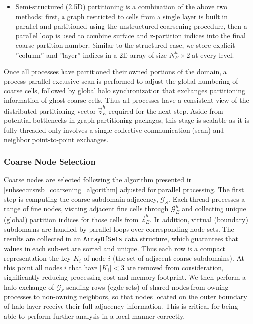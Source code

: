 \begin{itemize}
\item Semi-structured (2.5D) partitioning is a combination of the above two methods: first, a graph restricted to cells from a single layer is built in parallel and partitioned using the unstructured coarsening procedure, then a parallel loop is used to combine surface and z-partition indices into the final coarse partition number.   Similar to the structured case, we store explicit ''column'' and ''layer'' indices in a 2D array of size $N_E^h \times 2$ at every level.
\end{itemize}
Once all processes have partitioned their owned portions of the domain, a process-parallel exclusive scan is performed to adjust the global numbering of coarse cells, followed by global halo synchronization that exchanges partitioning information of ghost coarse cells.   Thus all processes have a consistent view of the distributed partitioning vector $\vec{z}_E^h$ required for the next step.   Aside from potential bottlenecks in graph partitioning packages, this stage is scalable as it is fully threaded only involves a single collective communication (scan) and neighbor point-to-point exchanges.

\subsubsection{Coarse Node Selection}
\label{subsubsec:par_kernels_coarsening_nodes}

Coarse nodes are selected following the algorithm presented in \cref{subsec:msrsb_coarsening_algorithm} adjusted for parallel processing.   The first step is computing the coarse subdomain adjacency, $\mathcal{G}_S$.   Each thread processes a range of fine nodes, visiting adjacent fine cells through $\mathcal{G}_E^h$ and collecting unique (global) partition indices for those cells from $\vec{z}_E^h$.   In addition, virtual (boundary) subdomains are handled by parallel loops over corresponding node sets.   The results are collected in an \texttt{ArrayOfSets} data structure, which guarantees that values in each sub-set are sorted and unique.   Thus each row is a compact representation the key $K_i$ of node $i$ (the set of adjacent coarse subdomains).   At this point all nodes $i$ that have $|K_i| < 3$ are removed from consideration, significantly reducing processing cost and memory footprint.   We then perform a halo exchange of $\mathcal{G}_S$ sending rows (egde sets) of shared nodes from owning processes to non-owning neighbors, so that nodes located on the outer boundary of halo layer receive their full adjacency information.    This is critical for being able to perform further analysis in a local manner correctly.

